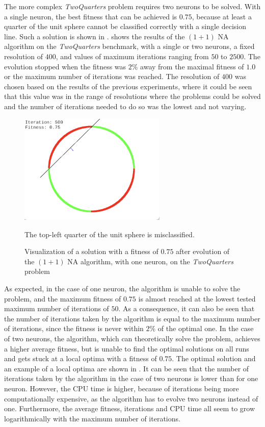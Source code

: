 The more complex \textit{TwoQuarters} problem requires two neurons to be solved. With a single neuron, the best fitness that can be achieved is $0.75$, because at least a quarter of the unit sphere
cannot be classified correctly with a single decision line. Such a solution is shown in .
 shows the results of the $(1 + 1)$ NA algorithm on the \textit{TwoQuarters} benchmark, with a single or two neurons,
a fixed resolution of $400$, and values of maximum iterations ranging from $50$ to $2500$. The evolution stopped when the fitness was $2\%$ away from the maximal fitness of $1.0$ or
the maximum number of iterations was reached. The resolution of $400$ was chosen based on the results of the previous experiments, where it could be seen that this value was in the range of
resolutions where the problems could be solved and the number of iterations needed to do so was the lowest and not varying.

\begin{figure}
    \centering
    \includegraphics[width=7cm]{Pictures/twoquarters-single}
    \caption{Visualization of a solution with a fitness of $0.75$ after evolution of the $(1 + 1)$ NA algorithm, with one neuron, on the \textit{TwoQuarters} problem}
    {The top-left quarter of the unit sphere is misclassified.}
    \label{fig:na_twoquarters_single_visual}
\end{figure}

As expected, in the case of one neuron, the algorithm is unable to solve the problem, and the maximum fitness of $0.75$ is almost reached at the lowest tested maximum number of iterations of $50$.
As a consequence, it can also be seen that the number of iterations taken by the algorithm is equal to the maximum number of iterations, since the fitness is never within $2\%$ of the optimal one.
In the case of two neurons, the algorithm, which can theoretically solve the problem, achieves a higher average fitness, but is unable to find the optimal solutions on all runs and gets stuck
at a local optima with a fitness of $0.75$. The optimal solution and an example of a local optima are shown in .
It can be seen that the number of iterations taken by the algorithm in the case of two neurons is lower than for one neuron. However, the CPU time is higher, because of iterations being more
computationally expensive, as the algorithm has to evolve two neurons instead of one.
Furthermore, the average fitness, iterations and CPU time all seem to grow logarithmically with the maximum number of iterations.

